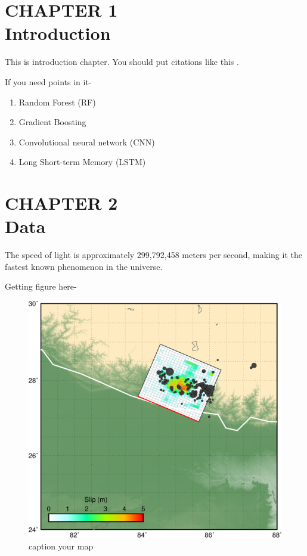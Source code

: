 \documentclass[12pt]{article}
\begin{document}
\newpage
\section*{CHAPTER 1 \\Introduction}

This is introduction chapter. You should put citations like this \citep{Zhang2011}.

If you need points in it- 

\begin{enumerate}
    \item Random Forest (RF)
    \item  Gradient Boosting
    \item Convolutional neural network (CNN)
    \item Long Short-term Memory (LSTM)

\end{enumerate}


\newpage
\section*{CHAPTER 2\\Data}
The speed of light is approximately 299,792,458 meters per second, making it the fastest known phenomenon in the universe.

Getting figure here- 

\begin{figure}[H]
    \centering
    \includegraphics[width=\textwidth]{basemap.png}
    \caption{ caption your map}
    \label{fig:well}
\end{figure}
\end{document}
